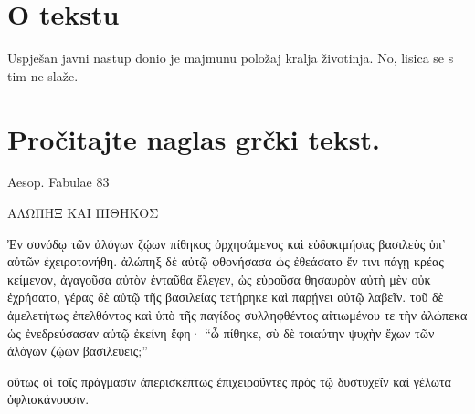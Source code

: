 


\section*{O tekstu}

Uspješan javni nastup donio je majmunu položaj kralja životinja. No, lisica se s tim ne slaže.


\section*{Pročitajte naglas grčki tekst.}


Aesop. Fabulae 83

\medskip

{\large
\begin{greek}
\noindent ΑΛΩΠΗΞ ΚΑΙ ΠΙΘΗΚΟΣ 

\noindent Ἐν συνόδῳ τῶν ἀλόγων ζῴων πίθηκος ὀρχησάμενος καὶ εὐδοκιμήσας βασιλεὺς ὑπ' αὐτῶν ἐχειροτονήθη. ἀλώπηξ δὲ αὐτῷ φθονήσασα ὡς ἐθεάσατο ἔν τινι πάγῃ κρέας κείμενον, ἀγαγοῦσα αὐτὸν ἐνταῦθα ἔλεγεν, ὡς εὑροῦσα θησαυρὸν αὐτὴ μὲν οὐκ ἐχρήσατο, γέρας δὲ αὐτῷ τῆς βασιλείας τετήρηκε καὶ παρῄνει αὐτῷ λαβεῖν. τοῦ δὲ ἀμελετήτως ἐπελθόντος καὶ ὑπὸ τῆς παγίδος συλληφθέντος αἰτιωμένου τε τὴν ἀλώπεκα ὡς ἐνεδρεύσασαν αὐτῷ ἐκείνη ἔφη· ``ὦ πίθηκε, σὺ δὲ τοιαύτην ψυχὴν ἔχων τῶν ἀλόγων ζῴων βασιλεύεις;''


οὕτως οἱ τοῖς πράγμασιν ἀπερισκέπτως ἐπιχειροῦντες πρὸς τῷ δυστυχεῖν καὶ γέλωτα ὀφλισκάνουσιν. 
\end{greek}

}

